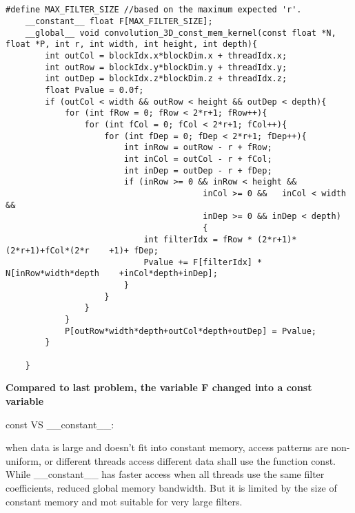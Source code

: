 \documentclass{article}
\begin{document}
\subsection{}
\begin{lstlisting}[basicstyle=\small\ttfamily, breaklines = true]
    #define MAX_FILTER_SIZE //based on the maximum expected 'r'.
    __constant__ float F[MAX_FILTER_SIZE];
    __global__ void convolution_3D_const_mem_kernel(const float *N, float *P, int r, int width, int height, int depth){
        int outCol = blockIdx.x*blockDim.x + threadIdx.x;
        int outRow = blockIdx.y*blockDim.y + threadIdx.y;
        int outDep = blockIdx.z*blockDim.z + threadIdx.z;
        float Pvalue = 0.0f;
        if (outCol < width && outRow < height && outDep < depth){
            for (int fRow = 0; fRow < 2*r+1; fRow++){
                for (int fCol = 0; fCol < 2*r+1; fCol++){
                    for (int fDep = 0; fDep < 2*r+1; fDep++){
                        int inRow = outRow - r + fRow;
                        int inCol = outCol - r + fCol;
                        int inDep = outDep - r + fDep;
                        if (inRow >= 0 && inRow < height && 
                                        inCol >= 0 &&   inCol < width && 
                                        inDep >= 0 && inDep < depth)
                                        {
                            int filterIdx = fRow * (2*r+1)*(2*r+1)+fCol*(2*r    +1)+ fDep;
                            Pvalue += F[filterIdx] * N[inRow*width*depth    +inCol*depth+inDep];
                        }
                    }
                }
            }
            P[outRow*width*depth+outCol*depth+outDep] = Pvalue;
        }
        
    }
\end{lstlisting}

\textbf{Compared to last problem, the variable F changed into a const variable}

const VS \_\_constant\_\_:

when data is large and doesn't fit into constant memory, access patterns are non-uniform, or different threads access different data shall use the function const. While \_\_constant\_\_ has faster access when all threads use the same filter coefficients, reduced global memory bandwidth. But it is limited by the size of constant memory and mot suitable for very large filters.
\end{document}
